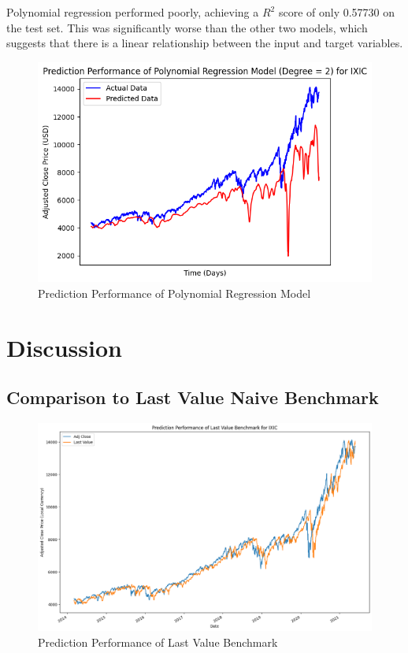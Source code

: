 \documentclass[a4paper, 11pt]{article}
\begin{document}
Polynomial regression performed poorly, achieving a $R^2$ score of only 0.57730 on the test set. This was significantly worse than the other two models, which suggests that there is a linear relationship between the input and target variables.

\begin{figure}[H]
    \begin{center}
        \includegraphics[width=1\textwidth]{Prediction Performance of Polynomial Regression Model.png}
        \caption{Prediction Performance of Polynomial Regression Model}
    \end{center}
\end{figure}

\section{Discussion}

\subsection{Comparison to Last Value Naive Benchmark}
\begin{figure}[H]
    \begin{center}
        \includegraphics[width=1\textwidth]{Prediction Performance of Last Value Benchmark.png}
        \caption{Prediction Performance of Last Value Benchmark}
    \end{center}
\end{figure}
\end{document}
